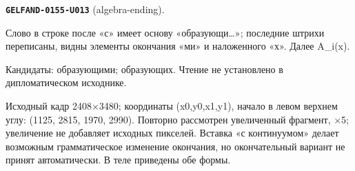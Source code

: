 \medskip
\par\noindent\leavevmode{}\label{GELFAND-0155-U013}\label{GELFAND-P001429:algebra-ending}\textbf{\texttt{GELFAND-0155-U013}} (algebra-ending).\nopagebreak[4]\par
Слово в строке после «с» имеет основу «образующи…»; последние штрихи переписаны, видны элементы окончания «ми» и наложенного «х». Далее A\_i(x).\par
Кандидаты: образующими; образующих. Чтение не установлено в дипломатическом исходнике.\par
Исходный кадр 2408×3480; координаты (x0,y0,x1,y1), начало в левом верхнем углу: (1125, 2815, 1970, 2990). Повторно рассмотрен увеличенный фрагмент, ×5; увеличение не добавляет исходных пикселей. Вставка «с континуумом» делает возможным грамматическое изменение окончания, но окончательный вариант не принят автоматически. В теле приведены обе формы.\par
\medskip
